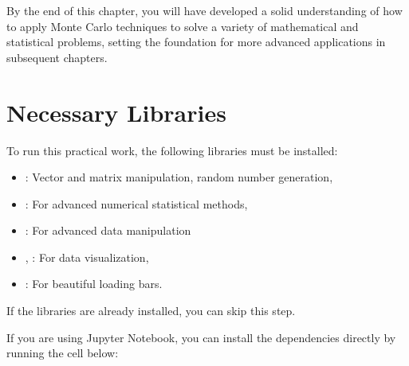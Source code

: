 \documentclass[letterpaper,10pt,english]{jupyterBook}
\begin{document}
\sphinxAtStartPar
By the end of this chapter, you will have developed a solid understanding of how to apply Monte Carlo techniques to solve a variety of mathematical and statistical problems, setting the foundation for more advanced applications in subsequent chapters.


\section{Necessary Libraries}
\label{\detokenize{01:necessary-libraries}}
\sphinxAtStartPar
To run this practical work, the following libraries must be installed:
\begin{itemize}
\item {} 
\sphinxAtStartPar
{}: Vector and matrix manipulation, random number generation,

\item {} 
\sphinxAtStartPar
{}: For advanced numerical statistical methods,

\item {} 
\sphinxAtStartPar
{}: For advanced data manipulation

\item {} 
\sphinxAtStartPar
{}, : For data visualization,

\item {} 
\sphinxAtStartPar
{}: For beautiful loading bars.

\end{itemize}

\begin{sphinxShadowBox}
\sphinxstylesidebartitle{}

\sphinxAtStartPar
If the libraries are already installed, you can skip this step.
\end{sphinxShadowBox}

\sphinxAtStartPar
If you are using Jupyter Notebook, you can install the dependencies directly by running the cell below:
\end{document}
